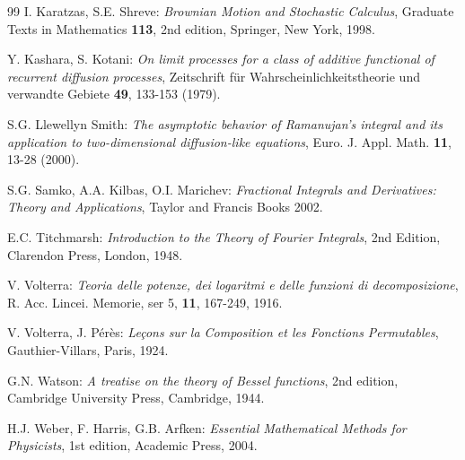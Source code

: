 \documentclass[10pt]{article}
\numberwithin{equation}{section}
\theoremstyle{definition}
\begin{document}
\begin{thebibliography}{99}
 I. Karatzas, S.E. Shreve: \emph{Brownian Motion and Stochastic Calculus}, Graduate Texts in Mathematics \textbf{113}, 2nd edition, Springer, New York, 1998.


 Y. Kashara, S. Kotani: \emph{On limit processes for a class of additive functional of recurrent diffusion processes}, Zeitschrift f\"ur Wahrscheinlichkeitstheorie und verwandte Gebiete \textbf{49}, 133-153 (1979).




   S.G.  Llewellyn Smith: \emph{The asymptotic behavior of Ramanujan's integral and its application to two-dimensional diffusion-like equations}, Euro. J.  Appl. Math. \textbf{11}, 13-28 (2000).






 S.G. Samko, A.A. Kilbas, O.I. Marichev: \emph{Fractional Integrals and Derivatives: Theory and Applications}, Taylor and Francis Books 2002. 


   E.C. Titchmarsh: \emph{Introduction to the Theory of Fourier Integrals}, 2nd Edition, Clarendon Press, London, 1948.



 V. Volterra: \emph{Teoria delle potenze, dei logaritmi e delle funzioni di decomposizione}, R. Acc. Lincei. Memorie, ser 5, \textbf{11}, 167-249, 1916.




 V. Volterra, J. P\'er\`es: \emph{Le\c{c}ons sur la Composition et les Fonctions Permutables},  Gauthier-Villars, Paris, 1924.



 G.N. Watson: \emph{A treatise on the theory of Bessel functions}, 2nd edition,  Cambridge University Press, Cambridge, 1944.




 H.J. Weber, F. Harris, G.B. Arfken: \emph{Essential Mathematical Methods for Physicists}, 1st edition,  Academic Press, 2004.




\end{thebibliography}
\end{document}
